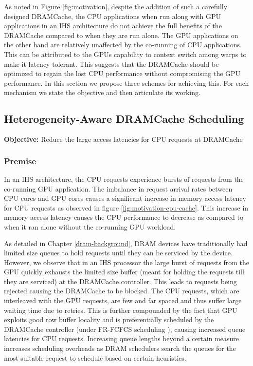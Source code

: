 As noted in Figure \ref{fig:motivation}, despite the addition of such a carefully designed DRAMCache, the CPU applications when run along with GPU applications in an IHS architecture do not achieve the full benefits of the DRAMCache compared to when they are run alone. The GPU applications on the other hand are relatively unaffected by the co-running of CPU applications. This can be attributed to the GPUs capability to context switch among warps to make it latency tolerant. This suggests that the DRAMCache should be optimized to regain the lost CPU performance without compromising the GPU performance. In this section we propose three schemes for achieving this. For each mechanism we state the objective and then articulate its working.


\subsection{Heterogeneity-Aware DRAMCache Scheduling} 
\textbf{Objective:} Reduce the large access latencies for CPU requests at DRAMCache
\subsubsection{Premise}
In an IHS architecture, the CPU requests experience bursts of requests from the co-running GPU application. The imbalance in request arrival rates between CPU cores and GPU cores causes a significant increase in memory access latency for CPU requests as observed in figure \ref{fig:motivation-cpu-cache}. This increase in memory access latency causes the CPU performance to decrease as compared to when it ran alone without the co-running GPU workload.
\par As detailed in Chapter \ref{dram-background}, DRAM devices have traditionally had limited size queues to hold requests until they can be serviced by the device. However, we observe that in an IHS processor the large burst of requests from the GPU quickly exhausts the limited size buffer (meant for holding the requests till they are serviced) at the DRAMCache controller. This leads to requests being rejected causing the DRAMCache to be blocked. 
The CPU requests, which are interleaved with the GPU requests, are few and far spaced and thus suffer large waiting time due to retries. This is further compounded by the fact that GPU exploits good row buffer locality and is preferentially scheduled by the DRAMCache controller (under FR-FCFCS scheduling \cite{sms}), causing increased queue latencies for CPU requests. Increasing queue lengths beyond a certain measure increases scheduling overheads as DRAM schedulers search the queues for the most suitable request to schedule based on certain heuristics.

